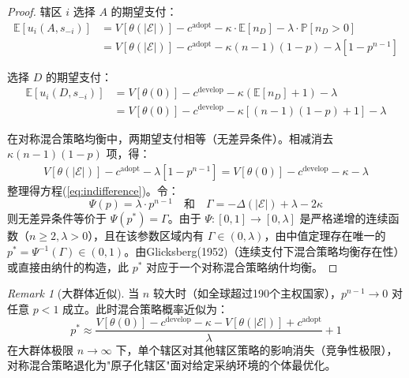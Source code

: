 \documentclass[12pt,a4paper]{ctexart}
\theoremstyle{definition}
\theoremstyle{remark}
\newtheorem{remark}{Remark}[section]
\begin{document}
\begin{proof}
辖区 $i$ 选择 $A$ 的期望支付：
\begin{align}
\mathbb{E}[u_i(A, s_{-i})] &= V[\theta(|\mathcal{E}|)] - c^{\text{adopt}} - \kappa \cdot \mathbb{E}[n_D] - \lambda \cdot \mathbb{P}[n_D > 0] \nonumber\\
&= V[\theta(|\mathcal{E}|)] - c^{\text{adopt}} - \kappa (n-1)(1-p) - \lambda\left[1 - p^{n-1}\right]
\end{align}

选择 $D$ 的期望支付：
\begin{align}
\mathbb{E}[u_i(D, s_{-i})] &= V[\theta(0)] - c^{\text{develop}} - \kappa(\mathbb{E}[n_D] + 1) - \lambda \nonumber\\
&= V[\theta(0)] - c^{\text{develop}} - \kappa[(n-1)(1-p) + 1] - \lambda
\end{align}

在对称混合策略均衡中，两期望支付相等（无差异条件）。相减消去 $\kappa(n-1)(1-p)$ 项，得：
\begin{align}
V[\theta(|\mathcal{E}|)] - c^{\text{adopt}} - \lambda\left[1 - p^{n-1}\right] = V[\theta(0)] - c^{\text{develop}} - \kappa - \lambda
\end{align}
整理得方程(\ref{eq:indifference})。令：
\begin{equation}
\Psi(p) = \lambda \cdot p^{n-1} \quad \text{和} \quad \Gamma = -\Delta(|\mathcal{E}|) + \lambda - 2\kappa
\end{equation}
则无差异条件等价于 $\Psi(p^*) = \Gamma$。由于 $\Psi: [0,1] \to [0,\lambda]$ 是严格递增的连续函数（$n \geq 2, \lambda > 0$），且在该参数区域内有 $\Gamma \in (0, \lambda)$，由中值定理存在唯一的 $p^* = \Psi^{-1}(\Gamma) \in (0,1)$。由Glicksberg(1952)（连续支付下混合策略均衡存在性）或直接由纳什的构造，此 $p^*$ 对应于一个对称混合策略纳什均衡。
\end{proof}

\begin{remark}[大群体近似]
当 $n$ 较大时（如全球超过190个主权国家），$p^{n-1} \to 0$ 对任意 $p < 1$ 成立。此时混合策略概率近似为：
\begin{equation}
p^* \approx \frac{V[\theta(0)] - c^{\text{develop}} - \kappa - V[\theta(|\mathcal{E}|)] + c^{\text{adopt}}}{\lambda} + 1
\end{equation}
在大群体极限 $n \to \infty$ 下，单个辖区对其他辖区策略的影响消失（竞争性极限），对称混合策略退化为"原子化辖区"面对给定采纳环境的个体最优化。
\end{remark}
\end{document}
